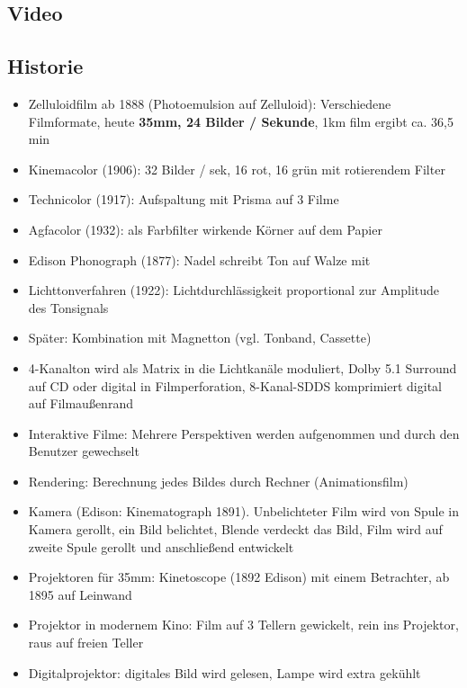 \documentclass[12pt,landscape]{article}
\begin{document}
\begin{multicols}{3}
\section{Video}
\subsection{Historie}
\begin{itemize}
\item Zelluloidfilm ab 1888 (Photoemulsion auf Zelluloid): Verschiedene Filmformate, heute \textbf{35mm, 24 Bilder / Sekunde}, 1km film ergibt ca. 36,5 min
\item Kinemacolor (1906): 32 Bilder / sek, 16 rot, 16 grün mit rotierendem Filter
\item Technicolor (1917): Aufspaltung mit Prisma auf 3 Filme
\item Agfacolor (1932): als Farbfilter wirkende Körner auf dem Papier
\item Edison Phonograph (1877): Nadel schreibt Ton auf Walze mit
\item Lichttonverfahren (1922): Lichtdurchlässigkeit proportional zur Amplitude des Tonsignals
\item Später: Kombination mit Magnetton (vgl. Tonband, Cassette)
\item 4-Kanalton wird als Matrix in die Lichtkanäle moduliert, Dolby 5.1 Surround auf CD oder digital in Filmperforation, 8-Kanal-SDDS komprimiert digital auf Filmaußenrand
\item Interaktive Filme: Mehrere Perspektiven werden aufgenommen und durch den Benutzer gewechselt
\item Rendering: Berechnung jedes Bildes durch Rechner (Animationsfilm)
\item Kamera (Edison: Kinematograph 1891). Unbelichteter Film wird von Spule in Kamera gerollt, ein Bild belichtet, Blende verdeckt das Bild, Film wird auf zweite Spule gerollt und anschließend entwickelt
\item Projektoren für 35mm: Kinetoscope (1892 Edison) mit einem Betrachter, ab 1895 auf Leinwand
\item Projektor in modernem Kino: Film auf 3 Tellern gewickelt, rein ins Projektor, raus auf freien Teller
\item Digitalprojektor: digitales Bild wird gelesen, Lampe wird extra gekühlt

\end{itemize}
\end{multicols}
\end{document}
